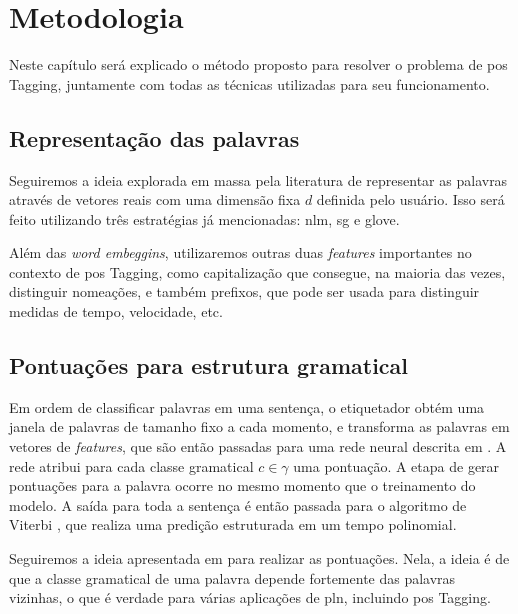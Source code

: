 \chapter{Metodologia}\label{desenvolvimento}

Neste capítulo será explicado o método proposto para resolver o problema de \ac{pos} Tagging, juntamente com todas as técnicas utilizadas para seu funcionamento.

\section{Representação das palavras}

Seguiremos a ideia explorada em massa pela literatura de representar as palavras através de vetores reais com uma dimensão fixa $d$ definida pelo usuário. Isso será feito utilizando três estratégias já mencionadas: \ac{nlm}, \ac{sg} e \ac{glove}.

Além das \textit{word embeggins}, utilizaremos outras duas \textit{features} importantes no contexto de \ac{pos} Tagging, como capitalização que consegue, na maioria das vezes, distinguir nomeações, e também prefixos, que pode ser usada para distinguir medidas de tempo, velocidade, etc. 

\section{Pontuações para estrutura gramatical}

Em ordem de classificar palavras em uma sentença, o etiquetador obtém uma janela de palavras de tamanho fixo a cada momento, e transforma as palavras em vetores de \textit{features}, que são então passadas para uma rede neural descrita em \cite{collobert2008unified}. A rede atribui para cada classe gramatical $c \in \gamma$ uma pontuação. A etapa de gerar pontuações para a palavra ocorre no mesmo momento que o treinamento do modelo. A saída para toda a sentença é então passada para o algoritmo de Viterbi \cite{viterbi1967error}, que realiza uma predição estruturada em um tempo polinomial.

Seguiremos a ideia apresentada em \cite{dos2014training} para realizar as pontuações. Nela, a ideia é de que a classe gramatical de uma palavra depende fortemente das palavras vizinhas, o que é verdade para várias aplicações de \ac{pln}, incluindo \ac{pos} Tagging.

